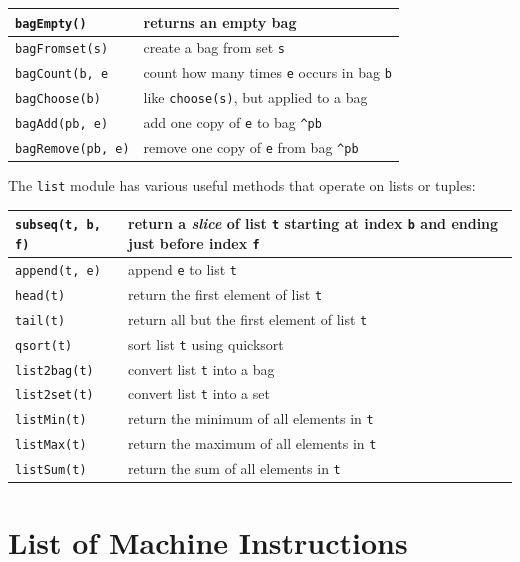 \documentclass{report}
\begin{document}
\vspace{1em}
\begin{tabular}{|l|l|}
\hline
\texttt{bagEmpty()} & returns an empty bag\\
\hline
\texttt{bagFromset(s)} & create a bag from set \texttt{s}\\
\hline
\texttt{bagCount(b, e} & count how many times \texttt{e} occurs in bag \texttt{b}\\
\hline
\texttt{bagChoose(b)} & like \texttt{choose(s)}, but applied to a bag\\
\hline
\texttt{bagAdd(pb, e)} & add one copy of \texttt{e} to bag \texttt{\^{}pb}\\
\hline
\texttt{bagRemove(pb, e)} & remove one copy of \texttt{e} from bag \texttt{\^{}pb}\\
\hline
\end{tabular}
\vspace{1em}

The \texttt{list} module has various useful methods that operate on lists
or tuples:

\vspace{1em}
\begin{tabular}{|l|l|}
\hline
\texttt{subseq(t, b, f)} & return a \emph{slice} of list \texttt{t} starting
at index \texttt{b} and ending just before index \texttt{f}\\
\hline
\texttt{append(t, e)} & append \texttt{e} to list \texttt{t}\\
\hline
\texttt{head(t)} & return the first element of list \texttt{t}\\
\hline
\texttt{tail(t)} & return all but the first element of list \texttt{t}\\
\hline
\texttt{qsort(t)} & sort list \texttt{t} using quicksort\\
\hline
\texttt{list2bag(t)} & convert list \texttt{t} into a bag \\
\hline
\texttt{list2set(t)} & convert list \texttt{t} into a set \\
\hline
\texttt{listMin(t)} & return the minimum of all elements in \texttt{t}\\
\hline
\texttt{listMax(t)} & return the maximum of all elements in \texttt{t}\\
\hline
\texttt{listSum(t)} & return the sum of all elements in \texttt{t}\\
\hline
\end{tabular}

\chapter{List of Machine Instructions}
\end{document}

